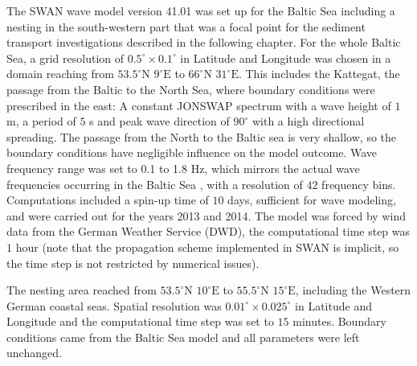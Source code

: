 The SWAN wave model version 41.01 was set up for the Baltic Sea including a 
nesting in the south-western part that was a focal point for the sediment 
transport investigations described in the following chapter. For the whole 
Baltic Sea, a grid 
resolution of $0.5^\circ \times 0.1^\circ $ in Latitude and Longitude was 
chosen 
in a domain reaching from $53.5^\circ \text{N } 9^\circ \text{E}$ to $66^\circ 
\text{N } 31^\circ \text{E}$. This includes the Kattegat, the passage from the 
Baltic to the North Sea, where boundary conditions were prescribed in the east: 
A constant JONSWAP spectrum with a wave height of $1$ m, a period of $5$ s and 
peak wave direction of $90^\circ$ with a high directional spreading. The 
passage 
from the North to the Baltic sea is very shallow, so the boundary conditions 
have negligible influence on the model outcome. Wave frequency range was set to 
0.1 to 1.8 Hz, which mirrors the actual wave frequencies occurring in the 
Baltic Sea \citep[][]{balticsea}, with a resolution of $42$ frequency bins. 
Computations included a spin-up time of $10$ days, sufficient for wave 
modeling, 
and were carried out for the years 2013 and 2014. The model was forced by wind 
data from the German Weather Service (DWD), the computational time step was $1$ 
hour (note that the propagation scheme implemented in SWAN is implicit, so the 
time step is not restricted by numerical issues). 

The nesting area reached from $53.5^\circ \text{N } 10^\circ \text{E}$ to 
$55.5^\circ \text{N } 15^\circ \text{E}$, including the Western German coastal 
seas. Spatial resolution was $0.01^\circ \times 0.025^\circ $ in Latitude and 
Longitude and the computational time step was set to $15$ minutes. Boundary 
conditions came from the Baltic Sea model and all parameters were left 
unchanged.

